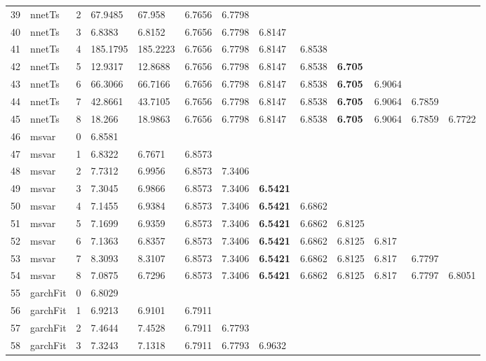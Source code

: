 \documentclass[10pt,a4paper]{article}
\begin{document}
\begin{table}[ht]
\begin{tabular}{rlrllllllllll}
  39 & nnetTs &     2 & 67.9485 & 67.958 & 6.7656 & 6.7798 &  &  &  &  &  &  \\ 
  40 & nnetTs &     3 & 6.8383 & 6.8152 & 6.7656 & 6.7798 & 6.8147 &  &  &  &  &  \\ 
  41 & nnetTs &     4 & 185.1795 & 185.2223 & 6.7656 & 6.7798 & 6.8147 & 6.8538 &  &  &  &  \\ 
  42 & nnetTs &     5 & 12.9317 & 12.8688 & 6.7656 & 6.7798 & 6.8147 & 6.8538 & \textbf{6.705} &  &  &  \\ 
  43 & nnetTs &     6 & 66.3066 & 66.7166 & 6.7656 & 6.7798 & 6.8147 & 6.8538 & \textbf{6.705} & 6.9064 &  &  \\ 
  44 & nnetTs &     7 & 42.8661 & 43.7105 & 6.7656 & 6.7798 & 6.8147 & 6.8538 & \textbf{6.705} & 6.9064 & 6.7859 &  \\ 
  45 & nnetTs &     8 & 18.266 & 18.9863 & 6.7656 & 6.7798 & 6.8147 & 6.8538 & \textbf{6.705} & 6.9064 & 6.7859 & 6.7722 \\ 
   \hline
46 & msvar &     0 & 6.8581 &  &  &  &  &  &  &  &  &  \\ 
  47 & msvar &     1 & 6.8322 & 6.7671 & 6.8573 &  &  &  &  &  &  &  \\ 
  48 & msvar &     2 & 7.7312 & 6.9956 & 6.8573 & 7.3406 &  &  &  &  &  &  \\ 
  49 & msvar &     3 & 7.3045 & 6.9866 & 6.8573 & 7.3406 & \textbf{6.5421} &  &  &  &  &  \\ 
  50 & msvar &     4 & 7.1455 & 6.9384 & 6.8573 & 7.3406 & \textbf{6.5421} & 6.6862 &  &  &  &  \\ 
  51 & msvar &     5 & 7.1699 & 6.9359 & 6.8573 & 7.3406 & \textbf{6.5421} & 6.6862 & 6.8125 &  &  &  \\ 
  52 & msvar &     6 & 7.1363 & 6.8357 & 6.8573 & 7.3406 & \textbf{6.5421} & 6.6862 & 6.8125 & 6.817 &  &  \\ 
  53 & msvar &     7 & 8.3093 & 8.3107 & 6.8573 & 7.3406 & \textbf{6.5421} & 6.6862 & 6.8125 & 6.817 & 6.7797 &  \\ 
  54 & msvar &     8 & 7.0875 & 6.7296 & 6.8573 & 7.3406 & \textbf{6.5421} & 6.6862 & 6.8125 & 6.817 & 6.7797 & 6.8051 \\ 
   \hline
55 & garchFit &     0 & 6.8029 &  &  &  &  &  &  &  &  &  \\ 
  56 & garchFit &     1 & 6.9213 & 6.9101 & 6.7911 &  &  &  &  &  &  &  \\ 
  57 & garchFit &     2 & 7.4644 & 7.4528 & 6.7911 & 6.7793 &  &  &  &  &  &  \\ 
  58 & garchFit &     3 & 7.3243 & 7.1318 & 6.7911 & 6.7793 & 6.9632 &  &  &  &  &  \\ 

\end{tabular}
\end{table}
\end{document}
